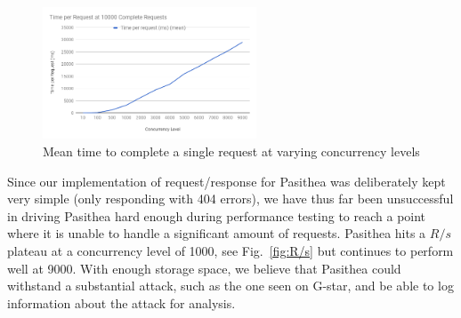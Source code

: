 \begin{figure}[t]
   \centering
   \includegraphics[width=2.5in]{images/TimeperRequest.png} 
   \caption{Mean time to complete a single request at varying concurrency levels}
   \label{fig:T/R}
\end{figure}

Since our implementation of request/response for Pasithea was deliberately kept very simple (only responding with 404 errors), we have thus far been unsuccessful in driving Pasithea hard enough during performance testing to reach a point where it is unable to handle a significant amount of requests.  
Pasithea hits a $R/s$ plateau at a concurrency level of 1000, see Fig.~\ref{fig:R/s} but continues to perform well at 9000.
With enough storage space, we believe that Pasithea could withstand a substantial attack, such as the one seen on G-star, and be able to log information about the attack for analysis.
